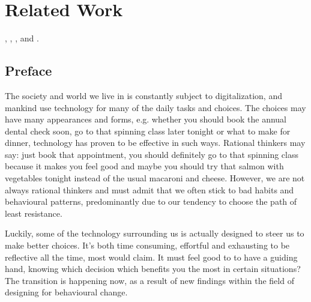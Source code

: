 \chapter{Related Work}

\cite{acquisti_nudges_2017}, \cite{al_stairs_nodate} \cite{suri_stairs_2014}, \cite{fogg_persuasive_2003}, and \cite{hamper_behavior_2016}.


\cite{karl_chapter_nodate}

\section*{Preface}


The society and world we live in is constantly subject to digitalization, and mankind use technology for many of the daily tasks and choices. The choices may have many appearances and forms, e.g. whether you should book the annual dental check soon, go to that spinning class later tonight or what to make for dinner, technology has proven to be effective in such ways. Rational thinkers may say: just book that appointment, you should definitely go to that spinning class because it makes you feel good and maybe you should try that salmon with vegetables tonight instead of the usual macaroni and cheese. However, we are not always rational thinkers and must admit that we often stick to bad habits and behavioural patterns, predominantly due to our tendency to choose the path of least resistance. 

Luckily, some of the technology surrounding us is actually designed to steer us to make better choices. It’s both time consuming, effortful and exhausting to be reflective all the time, most would claim. It must feel good to to have a guiding hand, knowing which decision which benefits you the most in certain situations? The transition is happening now, as a result of new findings within the field of designing for behavioural change. 


